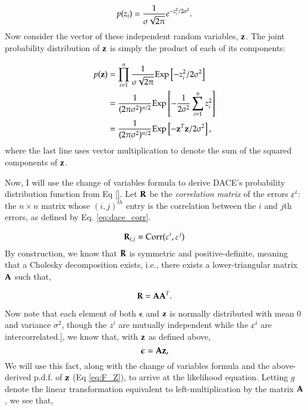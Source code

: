 \begin{equation} \label{eq:f_{Z_i}}
p(z_i)=\frac{1}{\sigma\sqrt{2\pi}}e^{-z_i^2/2\sigma^2}.
\end{equation}
Now consider the vector of these independent random variables, $\mathbf{z}$. The joint probability distribution of $\mathbf{z}$ is simply the product of each of its components:

\begin{align}  \label{eq:F_Z}
p(\mathbf{z}) &= \prod_{i=1}^n \frac{1}{\sigma\sqrt{2\pi}}\text{Exp}\left [-z_i^2/2\sigma^2\right ]  \\
			 &= \frac{1}{(2\pi\sigma^2)^{n/2}} \text{Exp}\left [ -\frac{1}{2\sigma^2}\sum_{i=1}^{n} z_i^2\right ] \nonumber\\
			 &= \frac{1}{(2\pi\sigma^2)^{n/2}} \text{Exp}\left [ -\mathbf{z}^T\mathbf{z}/2\sigma^2\right ],\nonumber
\end{align}
where the last line uses vector multiplication to denote the sum of the squared components of $\mathbf{z}$.

Now, I will use the change of variables formula to derive DACE's probability distribution function from Eq \ref{}. Let $\mathbf{R}$ be the \emph{correlation matrix} of the errors $\varepsilon^i$: the $n\times n$ matrix whose $(i,j)^{th}$ entry is the correlation between the $i$ and $j$th errors, as defined by Eq. \ref{eq:dace_corr}.

\begin{equation}\label{eq:R}
\mathbf{R}_{i,j}=\text{Corr}(\varepsilon^i,\varepsilon^j)
\end{equation}
By construction, we know that $\mathbf{R}$ is symmetric and positive-definite, meaning that a Cholesky decomposition exists\cite{linear_algebra}, i.e., there exists a lower-triangular matrix $\mathbf{A}$ such that,

\begin{equation} \label{eq:cholesky}
\mathbf{R} = \mathbf{A} \mathbf{A}^T.
\end{equation}


Now note that each element of both $\bm{\epsilon}$ and $\mathbf{z}$ is normally distributed with mean 0 and variance $\sigma^2$, though the $z^i$ are mutually independent while the $\varepsilon^i$ are intercorrelated.], we know that, with $\mathbf{z}$ as defined above,
\begin{equation} \label{Y_sub}
\bm{\epsilon}=\mathbf{A}\mathbf{z},
\end{equation}
We will use this fact, along with the change of variables formula and the above-derived p.d.f. of $\mathbf{z}$ (Eq \ref{eq:F_Z}), to arrive at the likelihood equation. Letting $g$ denote the linear transformation equivalent to left-multiplication by the matrix $\mathbf{A}$, we see that,

